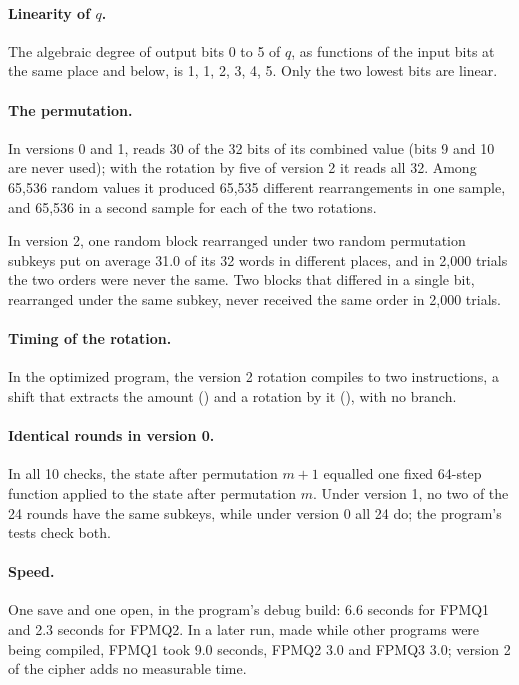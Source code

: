 \paragraph{Linearity of $q$.} The algebraic degree of output bits 0 to 5 of $q$,
as functions of the input bits at the same place and below, is 1, 1, 2, 3, 4,
5. Only the two lowest bits are linear.

\paragraph{The permutation.} In versions 0 and 1,  reads 30 of the
32 bits of its combined value (bits 9 and 10 are never used); with the rotation
by five of version 2 it reads all 32. Among 65,536 random values it produced
65,535 different rearrangements in one sample, and 65,536 in a second sample
for each of the two rotations.

In version 2, one random block rearranged under two random permutation subkeys
put on average 31.0 of its 32 words in different places, and in 2,000 trials the
two orders were never the same. Two blocks that differed in a single bit,
rearranged under the same subkey, never received the same order in 2,000 trials.

\paragraph{Timing of the rotation.} In the optimized program, the version 2
rotation compiles to two instructions, a shift that extracts the amount
() and a rotation by it (), with no branch.

\paragraph{Identical rounds in version 0.} In all 10 checks, the state after
permutation $m+1$ equalled one fixed 64-step function applied to the state after
permutation $m$. Under version 1, no two of the 24 rounds have the same
subkeys, while under version 0 all 24 do; the program's tests check both.

\paragraph{Speed.} One save and one open, in the program's debug build: 6.6
seconds for FPMQ1 and 2.3 seconds for FPMQ2. In a later run, made while other
programs were being compiled, FPMQ1 took 9.0 seconds, FPMQ2 3.0 and FPMQ3 3.0;
version 2 of the cipher adds no measurable time.

